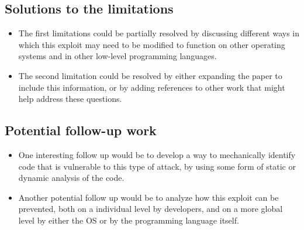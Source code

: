 \documentclass[11pt]{article}
\begin{document}
\subsection*{Solutions to the limitations}

\begin{itemize}
\item The first limitations could be partially resolved by discussing different ways in which this exploit may need to be modified to function on other operating systems and in other low-level programming languages.
\item The second limitation could be resolved by either expanding the paper to include this information, or by adding references to other work that might help address these questions. 
\end{itemize}

\subsection*{Potential follow-up work}

\begin{itemize}
\item One interesting follow up would be to develop a way to mechanically identify code that is vulnerable to this type of attack, by using some form of static or dynamic analysis of the code. 
\item Another potential follow up would be to analyze how this exploit can be prevented, both on a individual level by developers, and on a more global level by either the OS or by the programming language itself. 
\end{itemize}
\end{document}
